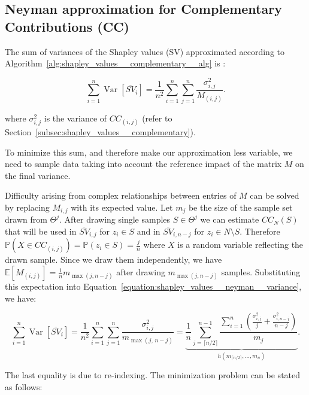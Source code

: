 \subsection{Neyman approximation for Complementary Contributions (CC)}
\label{subsec:shapley_values__neyman}

The sum of variances of the Shapley values (SV) approximated according to Algorithm~\ref{alg:shapley_values__complementary__alg} is \parencite{shapleyapproximations}:

\begin{equation}
\label{equation:shapley_values__neyman__variance}
\sum_{i=1}^{n} \operatorname{Var}\!\left[\overline{SV}_{i}\right]
= \frac{1}{n^{2}} \sum_{i=1}^{n} \sum_{j=1}^{n}
    \frac{\sigma_{i,j}^{2}}{M_{(i,j)}}.
\end{equation}

\noindent where $\sigma_{i,j}^2$ is the variance of $CC_{(i,j)}$ (refer to Section~\ref{subsec:shapley_values__complementary}).

To minimize this sum, and therefore make our approximation less variable, we need to sample data taking into account the reference impact of the matrix $M$ on the final variance.

\newpage
Difficulty arising from complex relationships between entries of $M$ can be solved by replacing $M_{i,j}$ with its expected value. Let $m_j$ be the size of the sample set drawn from $\Theta^j$. After drawing single samples $S \in \Theta^j$ we can estimate $CC_N(S)$ that will be used in $\overline{SV}_{i,j}$ for $z_i \in S$ and in $\overline{SV}_{i,n-j}$ for $z_i \in N \setminus S$. Therefore $\mathbb{P}(X \in CC_{(i,j)}) = \mathbb{P}(z_i \in S) = \frac{j}{n}$ where $X$ is a random variable reflecting the drawn sample. Since we draw them independently, we have $\mathbb{E}[M_{(i,j)}] = \frac{1}{n} m_{\max(j,n-j)}$ after drawing $m_{\max(j,n-j)}$ samples. Substituting this expectation into Equation~\ref{equation:shapley_values__neyman__variance}, we have:

\[
\sum_{i=1}^{n} \operatorname{Var}\!\left[\overline{SV}_{i}\right]
= \frac{1}{n^{2}} \sum_{i=1}^{n} \sum_{j=1}^{n}
    \frac{\sigma_{i,j}^{2}}{m_{\max(j,\, n-j)}}
= \underbrace{
    \frac{1}{n} \sum_{j=\lceil n/2 \rceil}^{n-1}
    \frac{
        \sum_{i=1}^{n}
        \left(
            \frac{\sigma_{i,j}^2}{j} +
            \frac{\sigma_{i,n-j}^2}{n-j}
        \right)
    }{m_j}
}_{h(m_{\lceil n/2 \rceil}, \dots, m_n)}.
\]

\noindent The last equality is due to re-indexing. The minimization problem can be stated as follows:

